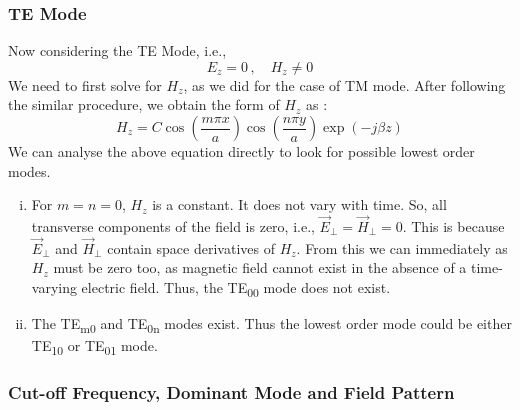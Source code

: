 \documentclass[12pt]{article}
\begin{document}
\subsubsection{TE Mode} %
Now considering the TE Mode, i.e.,
\begin{equation*}
  E_z=0 \, , \quad H_z \neq 0
\end{equation*}
We need to first solve for $H_z$, as we did for the case of TM mode. \linebreak
After following the similar procedure, we obtain the form of $H_z$ as :
\begin{equation}
  H_z = C \cos\left( \dfrac{m\pi x}{a} \right)\cos\left( \dfrac{n\pi y}{a} \right) \exp(-j\beta z) \label{eq:19}
\end{equation}
We can analyse the above equation directly to look for possible lowest order modes.
\begin{enumerate}[i.)]
  \item For $m=n=0$, $H_z$ is a constant. It does not vary with time. So, all transverse components of the field is zero, i.e., $\vec{E}_{\perp}=\vec{H}_{\perp}=0$. This is because $\vec{E}_{\perp}$ and $\vec{H}_{\perp}$ contain space derivatives of $H_z$. From this we can immediately as $H_z$ must be zero too, as magnetic field cannot exist in the absence of a time-varying electric field. Thus, the TE\textsubscript{00} mode does not exist. 
  \item The TE\textsubscript{m0} and TE\textsubscript{0n} modes exist. Thus the lowest order mode could be either TE\textsubscript{10} or TE\textsubscript{01} mode.
\end{enumerate}
\subsubsection{Cut-off Frequency, Dominant Mode and Field Pattern}
\end{document}
